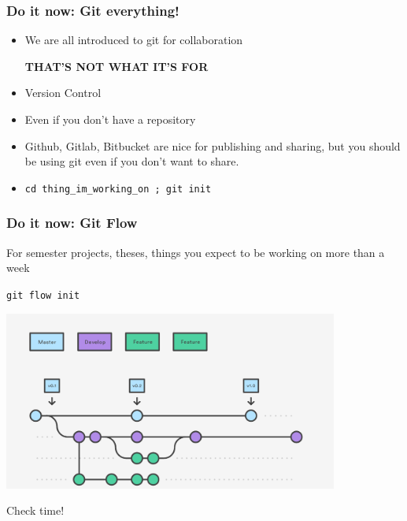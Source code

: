 \documentclass[10pt]{beamer}
\begin{document}
\begin{frame}[c]\frametitle{Do it now: Git everything!}

\begin{itemize}[<+->]
	\item We are all introduced to git for collaboration

	\pause

	\alert{\textbf{THAT'S NOT WHAT IT'S FOR}}

	\item Version Control

	\item Even if you don't have a repository

	\item Github, Gitlab, Bitbucket are nice for publishing and sharing, but you should be using git even if you don't want to share.

	\item \texttt{cd thing\_im\_working\_on ; git init}

\end{itemize}

\end{frame}

\begin{frame}[c]\frametitle{Do it now: Git Flow}
    For semester projects, theses, things you expect to be working on more than a week

    \pause

    \texttt{git flow init}

    \pause

    \centerline{\includegraphics[width=11cm]{figs/gitflow.png}}


\end{frame}






\begin{frame}[standout]
  Check time!
\end{frame}
\end{document}
